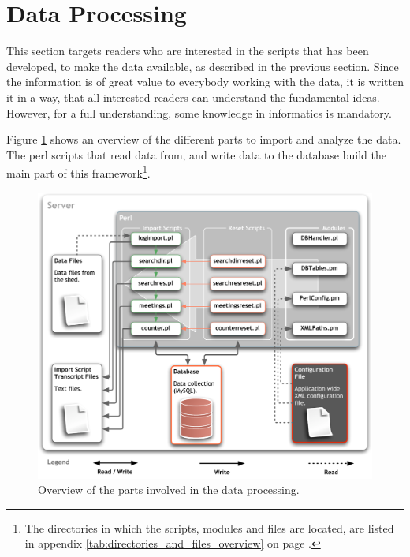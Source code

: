 \newpage
\section{Data Processing}
\label{sec:dataproc}

This section targets readers who are interested in the scripts that has been developed, to make the data available, as described in the previous section. Since the information is of great value to everybody working with the data, it is written it in a way, that all interested readers can understand the fundamental ideas. However, for a full understanding, some knowledge in informatics is mandatory.

Figure \ref{fig:app_design_perl} shows an overview of the different parts to import and analyze the data. The \ac{perl} scripts that read data from, and write data to the database build the main part of this framework\footnote{The directories in which the scripts, modules and files are located, are listed in appendix \ref{tab:directories_and_files_overview} on page \pageref{tab:directories_and_files_overview}.}.

\begin{figure}[htpb]
\begin{center}
  \includegraphics[width=\textwidth]{assets/pdf/app_design_perl.pdf}
  \caption[Data processing overview]{Overview of the parts involved in the data processing.}
  \label{fig:app_design_perl}
\end{center}
\end{figure}

